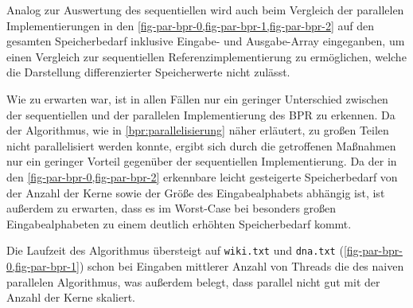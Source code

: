 Analog zur Auswertung des sequentiellen \bpr wird auch beim Vergleich der parallelen Implementierungen in den \cref{fig-par-bpr-0,fig-par-bpr-1,fig-par-bpr-2} auf den gesamten Speicherbedarf inklusive Eingabe- und Ausgabe-Array eingeganben, um einen Vergleich zur sequentiellen Referenzimplementierung zu ermöglichen, welche die Darstellung differenzierter Speicherwerte nicht zulässt.\par
Wie zu erwarten war, ist in allen Fällen nur ein geringer Unterschied zwischen der sequentiellen und der parallelen Implementierung des BPR zu erkennen.
Da der Algorithmus, wie in \cref{bpr:parallelisierung} näher erläutert, zu großen Teilen nicht parallelisiert werden konnte, ergibt sich durch die getroffenen Maßnahmen nur ein geringer Vorteil gegenüber der sequentiellen Implementierung.
Da der in den \cref{fig-par-bpr-0,fig-par-bpr-2} erkennbare leicht gesteigerte Speicherbedarf von der Anzahl der Kerne sowie der Größe des Eingabealphabets abhängig ist, ist außerdem zu erwarten, dass es im Worst-Case bei besonders großen Eingabealphabeten zu einem deutlich erhöhten Speicherbedarf kommt.\par\medskip
Die Laufzeit des Algorithmus übersteigt auf \texttt{wiki.txt} und \texttt{dna.txt} (\cref{fig-par-bpr-0,fig-par-bpr-1}) schon bei Eingaben mittlerer Anzahl von Threads die des naiven parallelen Algorithmus, was außerdem belegt, dass \bpr parallel nicht gut mit der Anzahl der Kerne skaliert.
